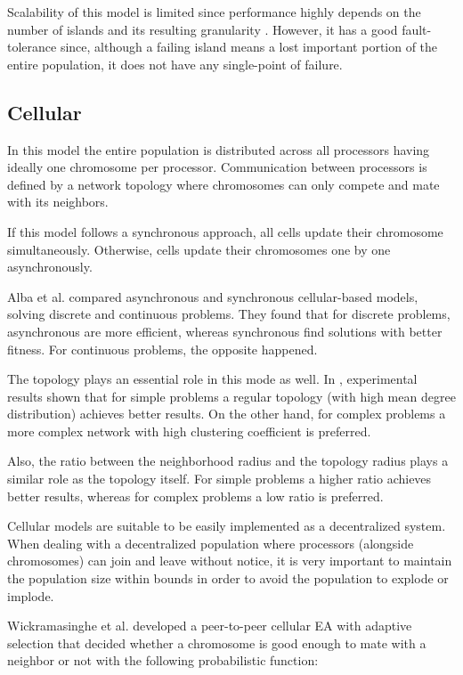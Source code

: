 Scalability of this model is limited since performance highly depends on the number of islands and its resulting granularity \cite{58}. However, it has a good fault-tolerance since, although a failing island means a lost important portion of the entire population, it does not have any single-point of failure.

\subsection{Cellular}
In this model the entire population is distributed across all processors having ideally one chromosome per processor. Communication between processors is defined by a network topology where chromosomes can only compete and mate with its neighbors.

If this model follows a synchronous approach, all cells update their chromosome simultaneously. Otherwise, cells update their chromosomes one by one asynchronously.

Alba et al. \cite{2} compared asynchronous and synchronous cellular-based models, solving discrete and continuous problems. They found that for discrete problems, asynchronous are more efficient, whereas synchronous find solutions with better fitness. For continuous problems, the opposite happened.

The topology plays an essential role in this mode as well. In \cite{68}, experimental results shown that for simple problems a regular topology (with high mean degree distribution) achieves better results. On the other hand, for complex problems a more complex network with high clustering coefficient is preferred.

Also, the ratio between the neighborhood radius and the topology radius plays a similar role as the topology itself. For simple problems a higher ratio achieves better results, whereas for complex problems a low ratio is preferred.\cite{5}

Cellular models are suitable to be easily implemented as a decentralized system. When dealing with a decentralized population where processors (alongside chromosomes) can join and leave without notice, it is very important to maintain the population size within bounds in order to avoid the population to explode or implode. 

Wickramasinghe et al. \cite{p2p-ea} developed a peer-to-peer cellular EA with adaptive selection that decided whether a chromosome is good enough to mate with a neighbor or not with the following probabilistic function:

